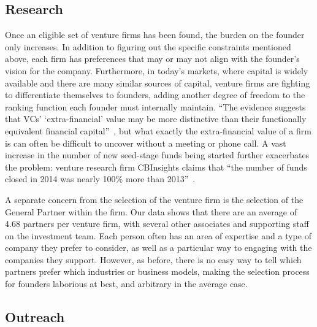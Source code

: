 \subsection{Research}

Once an eligible set of venture firms has been found, the burden on the founder only increases. In addition to figuring out the specific constraints mentioned above, each firm has preferences that may or may not align with the founder's vision for the company. Furthermore, in today's markets, where capital is widely available and there are many similar sources of capital, venture firms are fighting to differentiate themselves to founders, adding another degree of freedom to the ranking function each founder must internally maintain. ``The evidence suggests that VCs' `extra-financial' value may be more distinctive than their functionally equivalent financial capital''~\cite{doi:10.1111/j.1540-6261.2004.00680.x}, but what exactly the extra-financial value of a firm is can often be difficult to uncover without a meeting or phone call. A vast increase in the number of new seed-stage funds being started further exacerbates the problem: venture research firm CBInsights claims that ``the number of funds closed in 2014 was nearly 100\% more than 2013''~\cite{cbinsights-research-barbell}.

A separate concern from the selection of the venture firm is the selection of the General Partner within the firm. Our data shows that there are an average of 4.68 partners per venture firm, with several other associates and supporting staff on the investment team. Each person often has an area of expertise and a type of company they prefer to consider, as well as a particular way to engaging with the companies they support. However, as before, there is no easy way to tell which partners prefer which industries or business models, making the selection process for founders laborious at best, and arbitrary in the average case.

\subsection{Outreach}

